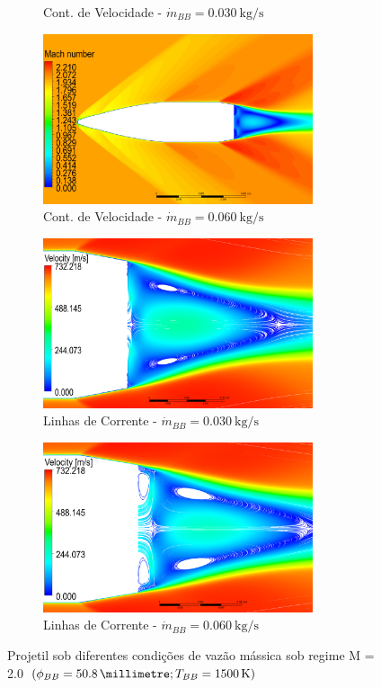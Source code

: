 \begin{figure}[!ht]
\begin{subfigure}[b]{0.47\textwidth}
        \caption{Cont. de Velocidade - $\Dot{m}_{BB} = \qty{0,030}{\kilogram\per\second}$}
        \label{fig:contorno-velocidade-bb-1500K-vazao0030}
    \end{subfigure}
    \hfill
	\begin{subfigure}[b]{0.47\textwidth}
        \centering
        \includegraphics[width=\textwidth,height=5cm]{contorno-velocidade-1500K-vazao-0060-2pol.png}
        \caption{Cont. de Velocidade - $\Dot{m}_{BB} = \qty{0,060}{\kilogram\per\second}$}
        \label{fig:contorno-velocidade-bb-1500K-vazao0060}
    \end{subfigure}
    \begin{subfigure}[b]{0.47\textwidth}
        \centering
        \includegraphics[width=\textwidth,height=5cm]{corrente-velocidade-1500K-vazao-0030-2pol.png}
        \caption{Linhas de Corrente - $\Dot{m}_{BB} = \qty{0,030}{\kilogram\per\second}$}
        \label{fig:corrente-velocidade-bb-1500K-vazao0030}
    \end{subfigure}
    \hfill
	\begin{subfigure}[b]{0.47\textwidth}
        \centering
        \includegraphics[width=\textwidth,height=5cm]{corrente-velocidade-1500K-vazao-0060-2pol.png}
        \caption{Linhas de Corrente - $\Dot{m}_{BB} = \qty{0,060}{\kilogram\per\second}$}
        \label{fig:corrente-velocidade-bb-1500K-vazao0060}
    \end{subfigure}
    \caption{Projetil sob diferentes condições de vazão mássica sob regime M = \num{2,0} $\left(\phi_{BB} = \qty{50,8}{\millimetre}; T_{BB} = \qty{1500}{\kelvin}\right)$}
	\label{fig:influencia-temperatura-bb}
\end{figure}

